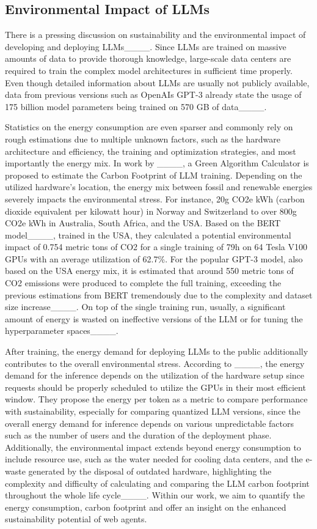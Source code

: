 \subsection{Environmental Impact of LLMs}
\label{sec:enviroment}
There is a pressing discussion on sustainability and the environmental impact of developing and deploying LLMs____.
Since LLMs are trained on massive amounts of data to provide thorough knowledge, large-scale data centers are required to train the complex model architectures in sufficient time properly.
Even though detailed information about LLMs are usually not publicly available, data from previous versions such as OpenAIs GPT-3 already state the usage of 175 billion model parameters being trained on 570 GB of data____.

Statistics on the energy consumption are even sparser and commonly rely on rough estimations due to multiple unknown factors, such as the hardware architecture and efficiency, the training and optimization strategies, and most importantly the energy mix.
In work by ____, a Green Algorithm Calculator is proposed to estimate the Carbon Footprint of LLM training.
Depending on the utilized hardware's location, the energy mix between fossil and renewable energies severely impacts the environmental stress. For instance, 20g CO2e kWh (carbon dioxide
equivalent per kilowatt hour) in Norway and Switzerland to over 800g CO2e kWh in Australia, South Africa, and the USA.
Based on the BERT model____, trained in the USA, they calculated a potential environmental impact of 0.754 metric tons of CO2 for a single training of 79h on 64 Tesla V100 GPUs with an average utilization of 62.7\%.
For the popular GPT-3 model, also based on the USA energy mix, it is estimated that around 550 metric tons of CO2 emissions were produced to complete the full training, exceeding the previous estimations from BERT tremendously due to the complexity and dataset size increase____.
On top of the single training run, usually, a significant amount of energy is wasted on ineffective versions of the LLM or for tuning the hyperparameter spaces____.

After training, the energy demand for deploying LLMs to the public additionally contributes to the overall environmental stress.
According to ____, the energy demand for the inference depends on the utilization of the hardware setup since requests should be properly scheduled to utilize the GPUs in their most efficient window.
They propose the energy per token as a metric to compare performance with sustainability, especially for comparing quantized LLM versions, since the overall energy demand for inference depends on various unpredictable factors such as the number of users and the duration of the deployment phase.
Additionally, the environmental impact extends beyond energy consumption to include resource use, such as the water needed for cooling data centers, and the e-waste generated by the disposal of outdated hardware, highlighting the complexity and difficulty of calculating and comparing the LLM carbon footprint throughout the whole life cycle____.
Within our work, we aim to quantify the energy consumption, carbon footprint and offer an insight on the enhanced sustainability potential of web agents.
 
%